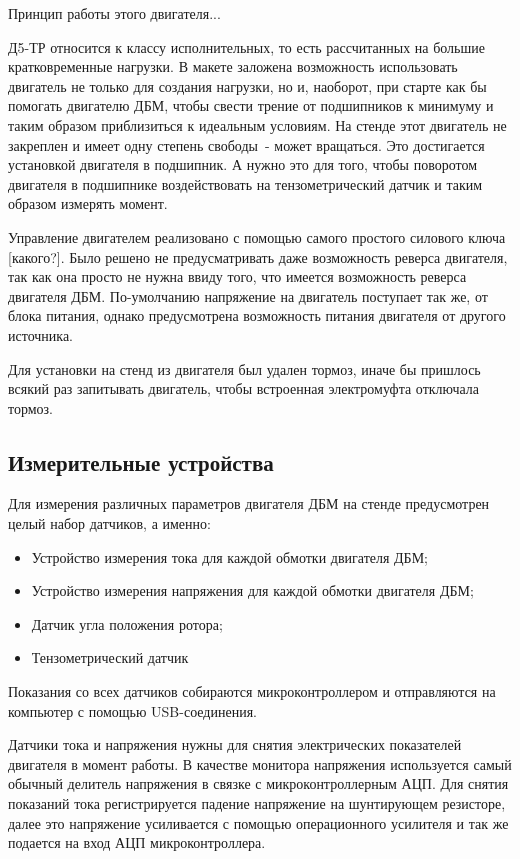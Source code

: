 Принцип работы этого двигателя...

Д5-ТР относится к классу исполнительных, то есть рассчитанных на большие 
кратковременные нагрузки. В макете заложена возможность использовать двигатель не только для
создания нагрузки, но и, наоборот, при старте как бы помогать двигателю ДБМ, чтобы
свести трение от подшипников к минимуму и таким образом приблизиться к идеальным условиям.
На стенде этот двигатель не закреплен и имеет одну степень свободы~- может вращаться. Это
достигается установкой двигателя в подшипник. А нужно это для того, чтобы поворотом двигателя в 
подшипнике воздействовать на тензометрический датчик и таким образом измерять момент.

\clearpage

Управление двигателем реализовано с помощью самого простого силового ключа [какого?].
Было решено не предусматривать даже возможность реверса двигателя, так как она просто не нужна
ввиду того, что имеется возможность реверса двигателя ДБМ. По-умолчанию напряжение на двигатель 
поступает так же, от блока питания, однако предусмотрена возможность питания двигателя от другого 
источника.

Для установки на стенд из двигателя был удален тормоз, иначе бы пришлось всякий раз 
запитывать двигатель, чтобы встроенная электромуфта отключала тормоз.

\subsection{Измерительные устройства}

Для измерения различных параметров двигателя ДБМ на стенде предусмотрен целый набор датчиков,
а именно:

\begin{itemize}
  \item Устройство измерения тока для каждой обмотки двигателя ДБМ;
  \item Устройство измерения напряжения для каждой обмотки двигателя ДБМ;
  \item Датчик угла положения ротора;
  \item Тензометрический датчик
\end{itemize}

Показания со всех датчиков собираются микроконтроллером и отправляются на компьютер
с помощью USB-соединения.

Датчики тока и напряжения нужны для снятия электрических показателей двигателя в момент работы.
В качестве монитора напряжения используется самый обычный делитель напряжения в связке
с микроконтроллерным АЦП. Для снятия показаний тока регистрируется падение напряжение на 
шунтирующем резисторе, далее это напряжение усиливается с помощью операционного усилителя и так же
подается на вход АЦП микроконтроллера.

